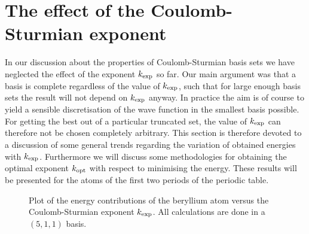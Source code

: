 \section{The effect of the Coulomb-Sturmian exponent}
\label{sec:kexp}

In our discussion about the properties of Coulomb-Sturmian basis sets
we have  neglected the effect of the \CS exponent $\kexp$ so far.
Our main argument was that a \CS basis is complete regardless of the
value of $\kexp$,
such that for large enough \CS basis sets
the result will not depend on $\kexp$ anyway.
In practice the aim is of course to yield a sensible
discretisation of the wave function in the smallest basis possible.
For getting the best out of a particular truncated set,
the value of $\kexp$ can therefore not be chosen completely arbitrary.
This section is therefore devoted to a discussion
of some general trends regarding
the variation of obtained energies with $\kexp$.
Furthermore we will discuss some methodologies
for obtaining the optimal exponent $k_\text{opt}$ with respect to minimising the \HF energy.
These results will be presented for the
atoms of the first two periods of the periodic table.

\begin{figure}
	\centering
	\caption[
		Plot of the \HF energy contributions
		versus the Coulomb-Sturmian exponent $\kexp$.
	]{
		Plot of the \HF energy contributions
		of the beryllium
		atom versus the Coulomb-Sturmian exponent $\kexp$.
		All calculations are done in a $(5,1,1)$ \CS basis.
	}
	\label{fig:EnergyTermsVsK}
\end{figure}

